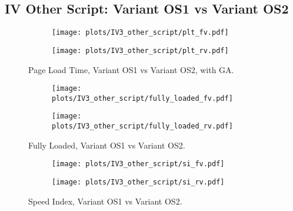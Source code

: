 \subsection{IV Other Script: Variant OS1 vs Variant OS2}


\begin{figure}
	\centering
	\begin{subfigure}{.5\textwidth}
		\centering
		\texttt{[image: plots/IV3\_other\_script/plt\_fv.pdf]}
		\label{fig:sub1}
	\end{subfigure}%
	\begin{subfigure}{.5\textwidth}
		\centering
		\texttt{[image: plots/IV3\_other\_script/plt\_rv.pdf]}
		\label{fig:sub2}
	\end{subfigure}
	\caption{Page Load Time, Variant OS1 vs Variant OS2, with GA.}
	\label{figure:plt_original_test}
\end{figure}


\begin{figure}
	\centering
	\begin{subfigure}{.5\textwidth}
		\centering
		\texttt{[image: plots/IV3\_other\_script/fully\_loaded\_fv.pdf]}
		\label{fig:sub1}
	\end{subfigure}%
	\begin{subfigure}{.5\textwidth}
		\centering
		\texttt{[image: plots/IV3\_other\_script/fully\_loaded\_rv.pdf]}
		\label{fig:sub2}
	\end{subfigure}
	\caption{Fully Loaded, Variant OS1 vs Variant OS2.}
	\label{figure:plt_original_test}
\end{figure}


\begin{figure}
	\centering
	\begin{subfigure}{.5\textwidth}
		\centering
		\texttt{[image: plots/IV3\_other\_script/si\_fv.pdf]}
		\label{fig:sub1}
	\end{subfigure}%
	\begin{subfigure}{.5\textwidth}
		\centering
		\texttt{[image: plots/IV3\_other\_script/si\_rv.pdf]}
		\label{fig:sub2}
	\end{subfigure}
	\caption{Speed Index, Variant OS1 vs Variant OS2.}
	\label{figure:plt_original_test}
\end{figure}



